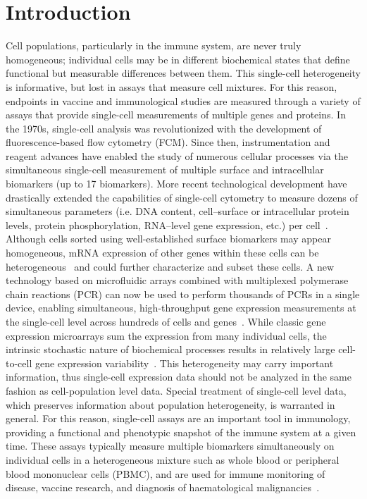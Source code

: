 \documentclass[12pt,oupdraft]{biostatistics}
\begin{document}
\clearpage
\section{Introduction}
\label{s:intro}
Cell populations, particularly in the immune system, are never truly homogeneous; individual cells may be in different biochemical states that define functional but measurable differences between them.
This single-cell heterogeneity is informative, but lost in assays that measure cell mixtures.
For this reason, endpoints in vaccine and immunological studies are measured through a variety of assays that provide single-cell measurements of multiple genes and proteins.
In the 1970s, single-cell analysis was revolutionized with the development of fluorescence-based flow cytometry (FCM).
Since then, instrumentation and reagent advances have enabled the study of numerous cellular processes via the simultaneous single-cell measurement of multiple surface and intracellular biomarkers (up to 17 biomarkers).
More recent technological development have drastically extended the capabilities of single-cell cytometry to measure dozens of simultaneous parameters (i.e. DNA content, cell--surface or intracellular protein levels, protein phosphorylation, RNA--level gene expression, etc.) per cell~\citep{Bendall:2011wf}.
Although cells sorted using well-established surface biomarkers may appear homogeneous, mRNA expression of other genes within these cells can be heterogeneous~\citep{Narsinh:2011gn, Flatz:2011jb} and could further characterize and subset these cells.
A new technology based on microfluidic arrays combined with multiplexed polymerase chain reactions (PCR) can now be used to perform thousands of PCRs in a single device, enabling simultaneous, high-throughput gene expression measurements at the single-cell level across hundreds of cells and genes~\citep{Pieprzyk:2009uc}.
While classic gene expression microarrays sum the expression from many individual cells, the intrinsic stochastic nature of biochemical processes results in relatively large cell-to-cell gene expression variability~\citep{vanOudenaarden200915a}.
This heterogeneity may carry important information, thus single-cell expression data should not be analyzed in the same fashion as cell-population level data.
Special treatment of single-cell level data, which preserves information about population heterogeneity, is warranted in general.
For this reason, single-cell assays are an important tool in immunology, providing a functional and phenotypic snapshot of the immune system at a given time.
These assays typically measure multiple biomarkers simultaneously on individual cells in a heterogeneous mixture such as whole blood or peripheral blood mononuclear cells  (PBMC), and are used for immune monitoring of disease, vaccine research, and diagnosis of haematological malignancies~\citep{Altman:1996wf,Betts:2006dw,Inokuma:2007tn}.
\end{document}
